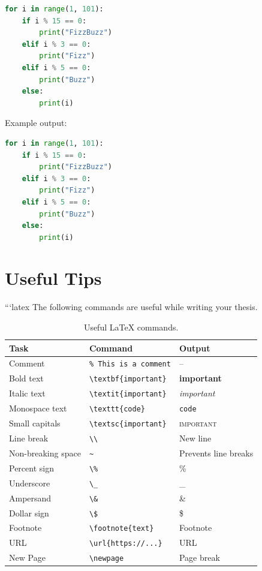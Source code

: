 \begin{latexexample}[caption={Creating a code snippet}]
\begin{lstlisting}[language=Python,caption={Example Python code},label={lst:fizzbuzz}]
for i in range(1, 101):
    if i % 15 == 0:
        print("FizzBuzz")
    elif i % 3 == 0:
        print("Fizz")
    elif i % 5 == 0:
        print("Buzz")
    else:
        print(i)
\end{lstlisting}
\end{latexexample}

Example output:

\begin{lstlisting}[language=Python,caption={Example Python code},label={lst:fizzbuzz}]
for i in range(1, 101):
    if i % 15 == 0:
        print("FizzBuzz")
    elif i % 3 == 0:
        print("Fizz")
    elif i % 5 == 0:
        print("Buzz")
    else:
        print(i)
\end{lstlisting}


\section{Useful Tips}

```latex
The following commands are useful while writing your thesis.

\begin{table}[ht]
\centering
\begin{tabular}{lll}
\toprule
Task & Command & Output\\
\midrule
Comment & \texttt{\% This is a comment} & --\\
Bold text & \texttt{\textbackslash textbf\{important\}} & \textbf{important}\\
Italic text & \texttt{\textbackslash textit\{important\}} & \textit{important}\\
Monospace text & \texttt{\textbackslash texttt\{code\}} & \texttt{code}\\
Small capitals & \texttt{\textbackslash textsc\{important\}} & \textsc{important}\\
Line break & \texttt{\textbackslash\textbackslash} & New line\\
Non-breaking space & \texttt{\textasciitilde} & Prevents line breaks\\
Percent sign & \texttt{\textbackslash\%} & \%\\
Underscore & \texttt{\textbackslash\_} & \_\\
Ampersand & \texttt{\textbackslash\&} & \&\\
Dollar sign & \texttt{\textbackslash\$} & \$\\
Footnote & \texttt{\textbackslash footnote\{text\}} & Footnote\\
URL & \texttt{\textbackslash url\{https://...\}} & URL\\
New Page & \texttt{\textbackslash newpage} & Page break\\
\bottomrule
\end{tabular}
\caption{Useful \LaTeX{} commands.}
\label{tab:tips}
\end{table}

